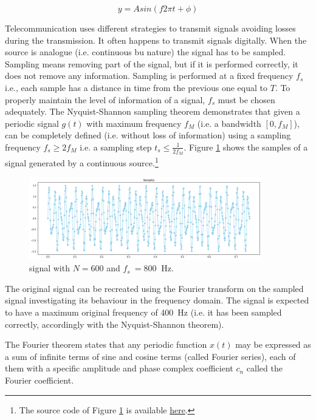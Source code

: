 \begin{equation}
y=Asin(f2\pi t+\phi)
\label{eq_frequency2}
\end{equation}

Telecommunication uses different strategies to transmit signals avoiding losses during the transmission. It often happens to transmit signals digitally. When the source is analogue (i.e. continuous bu nature) the signal has to be sampled. Sampling means removing part of the signal, but if it is performed correctly, it does not remove any information. Sampling is performed at a fixed frequency $f_s$ i.e., each sample has a distance in time from the previous one equal to $T$. To properly maintain the level of information of a signal, $f_s$ must be chosen adequately. The Nyquist-Shannon sampling theorem demonstrates that given a periodic signal $g\left(t\right)$ with maximum frequency $f_M$ (i.e. a bandwidth $[0,f_M]$), can be completely defined (i.e. without loss of information) using a sampling frequency $f_s\geq2f_M$ i.e. a sampling step $t_s\le\frac{1}{2f_M}$. Figure \ref{fig_signalsampling} shows the samples of a signal generated by a continuous source.\footnote{The source code of Figure \ref{fig_signalsampling} is available \href{https://github.com/aletuf93/logproj/blob/master/examples/03.\%20Statistics.ipynb}{here}.}


\begin{figure}[hbt!]
\centering
\includegraphics[width=0.9\textwidth]{SectionLetsMath/elemStat_figures/fig_signalsampling.png}
\captionsetup{type=figure}
\caption{signal with $N=600$ and $f_s\ =800\ $ Hz.}
\label{fig_signalsampling}
\end{figure}

The original signal can be recreated using the Fourier transform on the sampled signal investigating its behaviour in the frequency domain. The signal is expected to have a maximum original frequency of 400\ Hz (i.e. it has been sampled correctly, accordingly with the Nyquist-Shannon theorem).\par

The Fourier theorem states that any periodic function $x(t)$ may be expressed as a sum of infinite terms of sine and cosine terms (called Fourier series), each of them with a specific amplitude and phase complex coefficient $c_n$ called the Fourier coefficient. 

